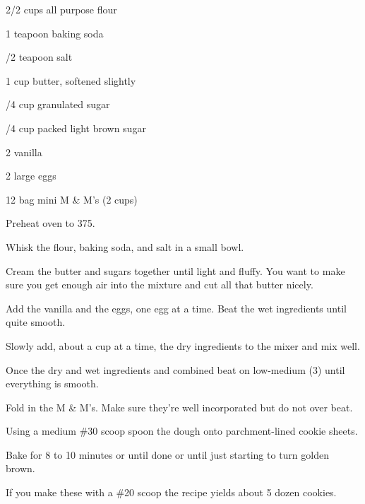 
\begin{IngredientsAndSteps}
    \ListIngredientsAndSteps
    {
        2/2 cups all purpose flour

        1 teapoon baking soda

        /2 teapoon salt

        \IngredientsSeparatorClear

        1 cup butter, softened slightly

        /4 cup granulated sugar

        /4 cup packed light brown sugar

        \IngredientsSeparatorClear

        2 \tsp[s] vanilla

        2 large eggs

        12 \Ounce bag mini M \& M's (2 cups)
    }
    {
        Preheat oven to 375\Degrees[F].

        Whisk the flour, baking soda, and salt in a small bowl.

        Cream the butter and sugars together until light and fluffy. You want to make sure you get
        enough air into the mixture and cut all that butter nicely.

        Add the vanilla and the eggs, one egg at a time. Beat the wet ingredients until quite smooth.

        Slowly add, about a cup at a time, the dry ingredients to the mixer and mix well.

        Once the dry and wet ingredients and combined beat on low-medium (3) until
        everything is smooth.

        Fold in the M \& M's. Make sure they're well incorporated but do not over beat.

        Using a medium \#30 scoop spoon the dough onto parchment-lined cookie sheets.

        Bake for 8 to 10 minutes or until done or until just starting to turn golden brown.
    }
\end{IngredientsAndSteps}


\begin{ChefNotes}
    {If you make these with a \#20 scoop the recipe yields about 5 dozen cookies.}
\end{ChefNotes}

